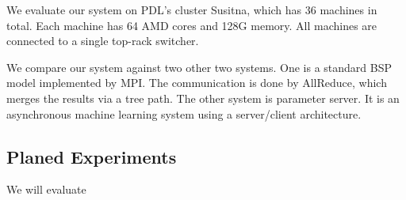 \documentclass{acm_proc_article-sp}
\begin{document}
We evaluate our system on PDL's cluster Susitna, which has 36 machines in
total. Each machine has 64 AMD cores and 128G memory. All machines are connected
to a single top-rack switcher.

We compare our system against two other two systems. One is a standard BSP
model implemented by MPI. The communication is done by AllReduce, which merges
the results via a tree path. The other system is parameter server. It is an
asynchronous machine learning system using a server/client architecture.

\subsection{Planed Experiments}

We will evaluate




\end{document}
